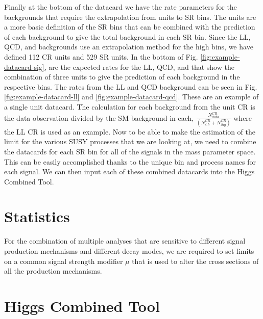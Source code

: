 Finally at the bottom of the datacard we have the rate parameters for the backgrounds that require the extrapolation from units to SR bins. The units are a more basic definition of the SR bins that can be combined with the prediction of each background to give the total background in each SR bin. Since the LL, QCD, and \Znunu{} backgrounds use an extrapolation method for the high \dm{} bins, we have defined 112 CR units and 529 SR units. In the bottom of Fig. \ref{fig:example-datacard-sig}, are the expected rates for the LL, QCD, and \Znunu{} that show the combination of three units to give the prediction of each background in the respective bins. The rates from the LL and QCD background can be seen in Fig. \ref{fig:example-datacard-ll} and \ref{fig:example-datacard-qcd}. These are an example of a single unit datacard. The calculation for each background from the unit CR is the data observation divided by the SM background in each, $\frac{N_{data}^{CR}}{(N_{LL}^{CR} + N_{Sig}^{CR})}$ where the LL CR is used as an example. Now to be able to make the estimation of the limit for the various SUSY processes that we are looking at, we need to combine the datacards for each SR bin for all of the signals in the mass parameter space. This can be easily accomplished thanks to the unique bin and process names for each signal. We can then input each of these combined datacards into the Higgs Combined Tool.

\section{Statistics}\label{sec:Statistics}

For the combination of multiple analyses that are sensitive to different signal production mechanisms and different decay modes, we are required to set limits on a common signal strength modifier $\mu$ that is used to alter the cross sections of all the production mechanisms. 

\section{Higgs Combined Tool}\label{sec:HiggsCombined}

